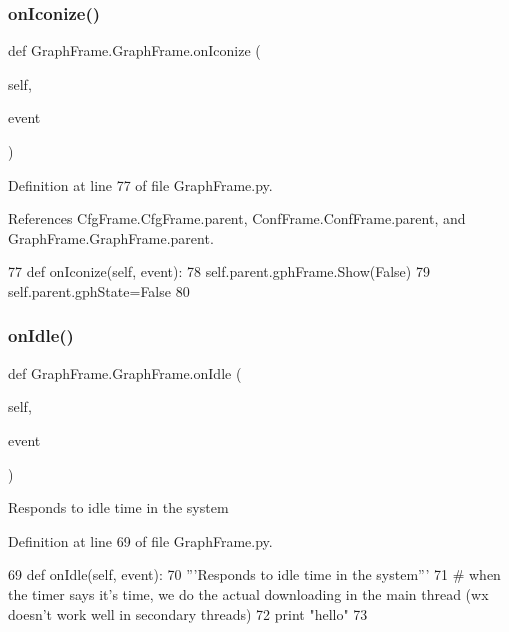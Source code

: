 \subsubsection{\texorpdfstring{on\+Iconize()}{onIconize()}}
{\footnotesize\ttfamily def Graph\+Frame.\+Graph\+Frame.\+on\+Iconize (\begin{DoxyParamCaption}\item[{}]{self,  }\item[{}]{event }\end{DoxyParamCaption})}



Definition at line 77 of file Graph\+Frame.\+py.



References Cfg\+Frame.\+Cfg\+Frame.\+parent, Conf\+Frame.\+Conf\+Frame.\+parent, and Graph\+Frame.\+Graph\+Frame.\+parent.


\begin{DoxyCode}
77     \textcolor{keyword}{def }onIconize(self, event):
78         self.parent.gphFrame.Show(\textcolor{keyword}{False})
79         self.parent.gphState=\textcolor{keyword}{False}
80 
\end{DoxyCode}
\mbox{\label{classGraphFrame_1_1GraphFrame_aa2baa5d8bd7aed70f505e6a815a3b350}} 
\subsubsection{\texorpdfstring{on\+Idle()}{onIdle()}}
{\footnotesize\ttfamily def Graph\+Frame.\+Graph\+Frame.\+on\+Idle (\begin{DoxyParamCaption}\item[{}]{self,  }\item[{}]{event }\end{DoxyParamCaption})}

\begin{DoxyVerb}Responds to idle time in the system\end{DoxyVerb}
 

Definition at line 69 of file Graph\+Frame.\+py.


\begin{DoxyCode}
69     \textcolor{keyword}{def }onIdle(self, event):
70         \textcolor{stringliteral}{'''Responds to idle time in the system'''}
71         \textcolor{comment}{# when the timer says it's time, we do the actual downloading in the main thread (wx doesn't work
       well in secondary threads)}
72         \textcolor{keywordflow}{print} \textcolor{stringliteral}{"hello"}        
73 
\end{DoxyCode}
\mbox{\label{classGraphFrame_1_1GraphFrame_a2b974345cbf4d2655e6adf1af6f18b16}} 
